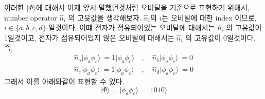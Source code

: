 \documentclass[10pt]{article}
\begin{document}
이러한 \(| \Phi \rangle\)에 대해서 이제 앞서 말했던것처럼 오비탈을 기준으로 표현하기 위해서, number operator \(\hat{n}_i\) 의 고윳값을 생각해보자. \(\hat{n}_i\)의 \(i\)는 오비탈에 대한 index 이므로, 
\(i \in \{a,b,c,d\}\) 일것이다. 이떄 전자가 점유되어있는 오비탈에 대해서는 \(\hat{n}_i\) 의 고유값이 1일것이고, 전자가 점유되어있지 않은 오비탈에 대해서는 \(\hat{n}_i\) 의 고유값이 0일것이다. 
즉, 
\begin{align*}
\hat{n}_a \vert \phi_a \phi_c \rangle\ = 1\vert \phi_a \phi_c \rangle\ &,\quad \hat{n}_b \vert \phi_a \phi_c \rangle\ = 0 \\
\hat{n}_c \vert \phi_a \phi_c \rangle\ = 1\vert \phi_a \phi_c \rangle\ &,\quad \hat{n}_d \vert \phi_a \phi_c \rangle\ = 0 
\end{align*}
그래서 이를 아래와같이 표현할 수 있다. 
\[| \Phi \rangle  = \vert \phi_a \phi_c \rangle = \vert 1010 \rangle  \] 
\end{document}
